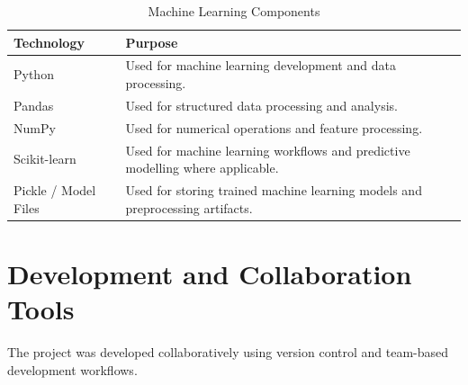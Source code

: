 \documentclass[12pt,a4paper]{report}
\begin{document}
\begin{table}[H]
\centering

\caption{Machine Learning Components}

\begin{tabular}{p{4cm} p{9cm}}

\toprule

\textbf{Technology} &
\textbf{Purpose}

\\

\midrule

Python &
Used for machine learning development and data processing.

\\[6pt]

Pandas &
Used for structured data processing and analysis.

\\[6pt]

NumPy &
Used for numerical operations and feature processing.

\\[6pt]

Scikit-learn &
Used for machine learning workflows and predictive modelling where
applicable.

\\[6pt]

Pickle / Model Files &
Used for storing trained machine learning models and preprocessing
artifacts.

\\

\bottomrule

\end{tabular}

\end{table}



\section{Development and Collaboration Tools}

The project was developed collaboratively using version control and
team-based development workflows.
\end{document}
